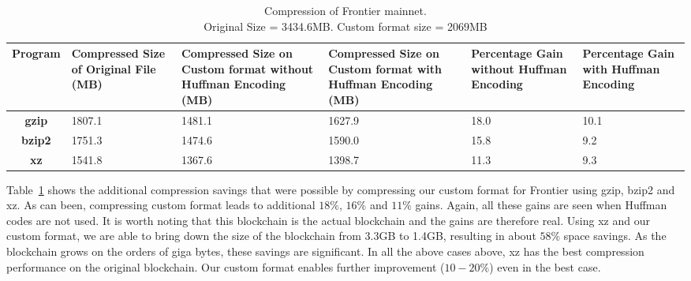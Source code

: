 \begin{table}[H]
	\centering
\captionsetup{justification=centering}
\begin{tabular}{ >{\bfseries}c| p{2cm} | p{2cm} | p{2cm} | p{1.5cm} | p{1.5cm} }
	Program & {Compressed Size of Original File (MB)} & {Compressed Size on Custom format without Huffman Encoding (MB)} & {Compressed Size on Custom format with Huffman Encoding (MB)} &Percentage Gain without Huffman Encoding & Percentage Gain with Huffman Encoding\\
  \hline
  gzip  & 1807.1 & 1481.1 & 1627.9 & 18.0 & 10.1 \\
  bzip2 & 1751.3 & 1474.6 & 1590.0 & 15.8 & 9.2 \\
  xz   & 1541.8 & 1367.6 & 1398.7 & 11.3  & 9.3 \\
\end{tabular}
\caption{Compression of Frontier mainnet. \\ Original Size = 3434.6MB. Custom format size = 2069MB}
\label{tab:compfrontier}
\end{table}
Table~\ref{tab:compfrontier} 
shows the additional compression savings that were possible by compressing 
our custom format for Frontier  using gzip, bzip2 and xz.
As can been, compressing custom format leads to additional $18\%$, $16\%$ and $11\%$  gains. Again, all these gains are seen when
Huffman codes are not used. It is worth noting that this blockchain
is the actual \eth{} blockchain and the gains are therefore real.
Using xz and our custom format, we are able to
bring down the size of the blockchain from 3.3GB to 1.4GB, 
resulting in about $58\%$ space savings.
As the blockchain grows on the orders of giga bytes, these savings are significant.
In all the above cases above, xz has the best compression performance on the original blockchain. 
Our custom format enables further improvement ($10-20\%$) even in the best case.

